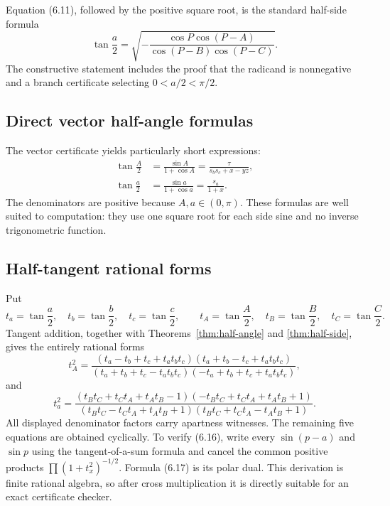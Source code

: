 \begin{remark}
Equation (6.11), followed by the positive square root, is the standard
half-side formula
\[
 \tan\frac a2=
 \sqrt{-\frac{\cos P\cos(P-A)}
 {\cos(P-B)\cos(P-C)}}.
\]
The constructive statement includes the proof that the radicand is
nonnegative and a branch certificate selecting \(0<a/2<\pi/2\).
\end{remark}

\subsection{Direct vector half-angle formulas}

The vector certificate yields particularly short expressions:
\begin{align}
 \tan\frac A2
 &=\frac{\sin A}{1+\cos A}
 =\frac{\tau}{s_bs_c+x-yz},                                \tag{6.14}\\
 \tan\frac a2
 &=\frac{\sin a}{1+\cos a}
 =\frac{s_a}{1+x}.                                         \tag{6.15}
\end{align}
The denominators are positive because \(A,a\in(0,\pi)\).  These formulas are
well suited to computation: they use one square root for each side sine and no
inverse trigonometric function.

\subsection{Half-tangent rational forms}

Put
\[
 t_a=\tan\frac a2,
 \quad t_b=\tan\frac b2,
 \quad t_c=\tan\frac c2,
 \qquad
 t_A=\tan\frac A2,
 \quad t_B=\tan\frac B2,
 \quad t_C=\tan\frac C2.
\]
Tangent addition, together with Theorems~\ref{thm:half-angle} and
\ref{thm:half-side}, gives the entirely rational forms
\begin{equation}
 t_A^2=
 \frac{(t_a-t_b+t_c+t_at_bt_c)(t_a+t_b-t_c+t_at_bt_c)}
 {(t_a+t_b+t_c-t_at_bt_c)(-t_a+t_b+t_c+t_at_bt_c)},        \tag{6.16}
\end{equation}
and
\begin{equation}
 t_a^2=
 \frac{(t_Bt_C+t_Ct_A+t_At_B-1)
       (-t_Bt_C+t_Ct_A+t_At_B+1)}
 {(t_Bt_C-t_Ct_A+t_At_B+1)
       (t_Bt_C+t_Ct_A-t_At_B+1)}.                          \tag{6.17}
\end{equation}
All displayed denominator factors carry apartness witnesses.  The remaining
five equations are obtained cyclically.  To verify (6.16), write every
\(\sin(p-a)\) and \(\sin p\) using the tangent-of-a-sum formula and cancel the
common positive products \(\prod(1+t_x^2)^{-1/2}\).  Formula (6.17) is its polar
dual.  This derivation is finite rational algebra, so after cross multiplication
it is directly suitable for an exact certificate checker.

